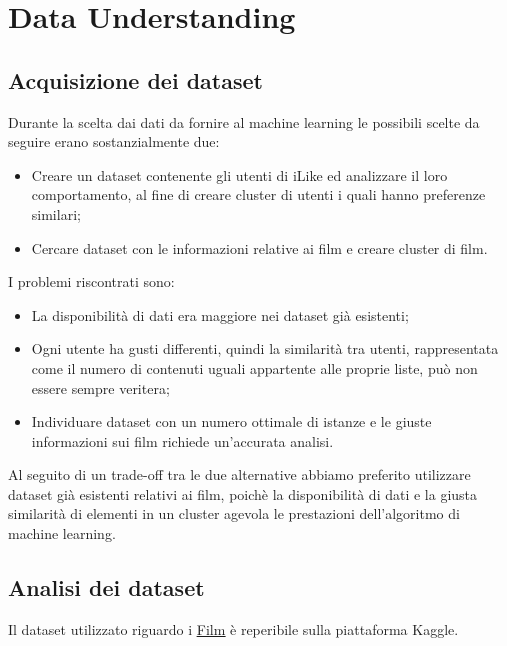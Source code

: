 \documentclass[a4paper, 10pt]{report}
\begin{document}
    \chapter{Data Understanding}\label{ch:data-understanding}

        \section{Acquisizione dei dataset}\label{sec:acquisizione-dei-dataset}
            Durante la scelta dai dati da fornire al machine learning le possibili scelte da seguire erano sostanzialmente due:
            \begin{itemize}
                \item Creare un dataset contenente gli utenti di iLike ed analizzare il loro comportamento, al fine di creare
                      cluster di utenti i quali hanno preferenze similari;
                \item Cercare dataset con le informazioni relative ai film e creare cluster di film.
            \end{itemize}

            I problemi riscontrati sono:
            \begin{itemize}
                \item La disponibilità di dati era maggiore nei dataset già esistenti;
                \item Ogni utente ha gusti differenti, quindi la similarità tra utenti, rappresentata come il numero di contenuti uguali
                      appartente alle proprie liste, può non essere sempre veritera;
                \item Individuare dataset con un numero ottimale di istanze e le giuste informazioni sui film richiede
                      un'accurata analisi.
            \end{itemize}
            Al seguito di un trade-off tra le due alternative abbiamo preferito utilizzare dataset già esistenti relativi ai film,
            poichè la disponibilità di dati e la giusta similarità di elementi in un cluster agevola le prestazioni dell'algoritmo
            di machine learning.

        \section{Analisi dei dataset}\label{sec:analisi-dei-dataset}
            Il dataset utilizzato riguardo i \href{https://www.kaggle.com/datasets/stefanoleone992/filmtv-movies-dataset?resource=download}{\underline{Film}}
            è reperibile sulla piattaforma Kaggle.
\end{document}
